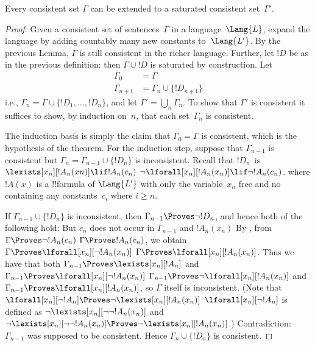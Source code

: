 \documentclass[../../include/open-logic-section]{subfiles}
\begin{document}
\begin{thm}
Every consistent set $\Gamma$ can be extended to a saturated
consistent set~$\Gamma'$.
\end{thm}

\begin{proof}
Given a consistent set of sentences~$\Gamma$ in a language~$\Lang{L}$,
expand the language by adding countably many new constants
to~$\Lang{L'}$. By the previous Lemma, $\Gamma$ is still consistent in
the richer language. Further, let $!D$ be as in the previous
definition: then $\Gamma \cup !D$ is saturated by construction. Let
\begin{align*}
\Gamma_0 & = \Gamma \\
\Gamma_{n+1} & = \Gamma_n \cup \{!D_{n+1} \}
\end{align*}
i.e., $\Gamma_n = \Gamma \cup \{ !D_1, \dots, !D_n \}$, and let
$\Gamma' = \bigcup_{n} \Gamma_n$.  To show that $\Gamma'$ is
consistent it suffices to show, by induction on~$n$, that each
set~$\Gamma_n$ is consistent.

The induction basis is simply the claim that $\Gamma_0 = \Gamma$ is
consistent, which is the hypothesis of the theorem.  For the induction
step, suppose that $\Gamma_{n-1}$ is consistent but $\Gamma_n =
\Gamma_{n-1} \cup \{!D_n\}$ is inconsistent. Recall that $!D_n$~is
{$\lexists[x_{n}][!A_{n}(xn)] \lif !A_{n}(c_{n})$}
{$\lnot\lforall[x_{n}][!A_{n}(x_n)] \lif \lnot !A_{n}(c_{n})$}. 
where $!A(x)$ is a !!{formula} of $\Lang{L'}$ with only the
variable~$x_n$ free and no containing any constants~$c_i$ where $i \ge
n$. 

If $\Gamma_{n-1} \cup \{!D_n\}$ is inconsistent, then $\Gamma_{n-1}
\Proves \lnot !D_n$, and hence both of the following hold:
But $c_n$ does not occur in $\Gamma_{n-1}$ 
and $!A_n(x_n)$
By , from 
{$\Gamma \Proves \lnot !A_n(c_n)$} 
{$\Gamma \Proves !A_n(c_n)$}, 
we obtain 
{$\Gamma \Proves \lforall[x_n][\lnot !A_n(x_n)]$}
{$\Gamma \Proves \lforall[x_n][!A_n(x_n)]$}.
Thus we have that both 
{$\Gamma_{n-1} \Proves \lexists[x_n][!A_n]$ and 
$\Gamma_{n-1} \Proves \lforall[x_n][\lnot !A_n(x_n)]$}
{$\Gamma_{n-1} \Proves \lnot\lforall[x_n][!A_n(x_n)]$ and 
$\Gamma_{n-1} \Proves \lforall[x_n][!A_n(x_n)]$},
so $\Gamma$ itself is inconsistent. 
{(Note that 
{$\lforall[x_n][\lnot !A_n] \Proves
  \lnot\lexists[x_n][!A_n(x_n)]$}
{$\lforall[x_n][\lnot !A_n]$ is defined as
  $\lnot\lexists[x_n][\lnot\lnot !A_n(x_n)]$ and
  $\lnot\lexists[x_n][\lnot\lnot !A_n(x_n)] \Proves
  \lnot\lexists[x_n][!A_n(x_n)]$}.)}{}
Contradiction: $\Gamma_{n-1}$ was supposed to be consistent. Hence
$\Gamma_n \cup \{ !D_n\}$ is consistent.
\end{proof}
\end{document}
